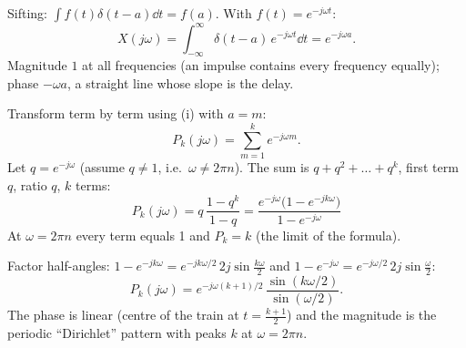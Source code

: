 \begin{solution}
 Sifting: $\int f(t)\delta(t-a)\dd t=f(a)$. With $f(t)=e^{-j\omega t}$:
\[X(j\omega)=\int_{-\infty}^{\infty}\delta(t-a)\,e^{-j\omega t}\dd t=e^{-j\omega a}.\]
Magnitude $1$ at all frequencies (an impulse contains every frequency equally); phase $-\omega a$, a straight line whose slope is the delay.

 Transform term by term using (i) with $a=m$:
\[P_k(j\omega)=\sum_{m=1}^{k}e^{-j\omega m}.\]
 Let $q=e^{-j\omega}$ (assume $q\ne1$, i.e.\ $\omega\ne2\pi n$). The sum is $q+q^2+\dots+q^k$, first term $q$, ratio $q$, $k$ terms:
\[P_k(j\omega)=q\,\frac{1-q^k}{1-q}=\boxed{\frac{e^{-j\omega}\big(1-e^{-jk\omega}\big)}{1-e^{-j\omega}}}\]
At $\omega=2\pi n$ every term equals 1 and $P_k=k$ (the limit of the formula).

 Factor half-angles: $1-e^{-jk\omega}=e^{-jk\omega/2}\,2j\sin\frac{k\omega}2$ and $1-e^{-j\omega}=e^{-j\omega/2}\,2j\sin\frac\omega2$:
\[P_k(j\omega)=e^{-j\omega(k+1)/2}\,\frac{\sin(k\omega/2)}{\sin(\omega/2)} .\]
The phase is linear (centre of the train at $t=\frac{k+1}2$) and the magnitude is the periodic ``Dirichlet'' pattern with peaks $k$ at $\omega=2\pi n$.
\begin{center}
\end{center}
\end{solution}

